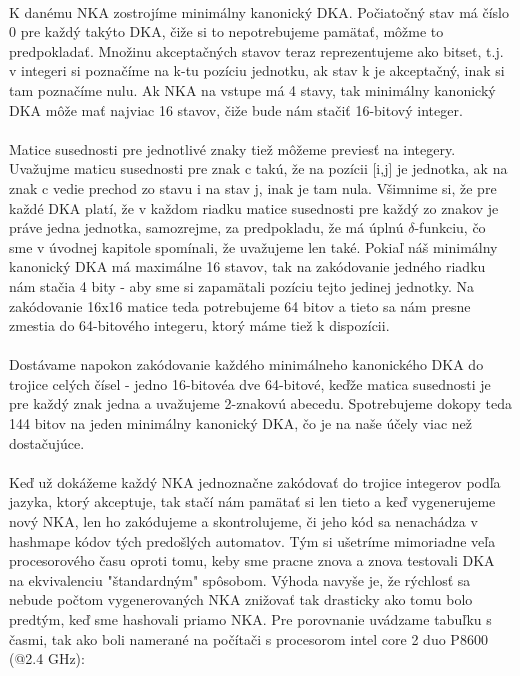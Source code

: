 \paragraph{}
K danému NKA zostrojíme minimálny kanonický DKA. Počiatočný stav má číslo 0 pre každý takýto DKA, čiže si to nepotrebujeme pamätať, môžme to predpokladať. Množinu akceptačných stavov teraz reprezentujeme ako bitset, t.j. v integeri si poznačíme na k-tu pozíciu jednotku, ak stav k je akceptačný, inak si tam poznačíme nulu. Ak NKA na vstupe má 4 stavy, tak minimálny kanonický DKA môže mať najviac 16 stavov, čiže bude nám stačiť 16-bitový integer. 
\paragraph{}
Matice susednosti pre jednotlivé znaky tiež môžeme previesť na integery. Uvažujme maticu susednosti pre znak c takú, že na pozícii [i,j] je jednotka, ak na znak c vedie prechod zo stavu i na stav j, inak je tam nula. Všimnime si, že pre každé DKA platí, že v každom riadku matice susednosti pre každý zo znakov je práve jedna jednotka, samozrejme, za predpokladu, že má úplnú $\delta$-funkciu, čo sme v úvodnej kapitole spomínali, že uvažujeme len také. Pokiaľ náš minimálny kanonický DKA má maximálne 16 stavov, tak na zakódovanie jedného riadku nám stačia 4 bity - aby sme si zapamätali pozíciu tejto jedinej jednotky. Na zakódovanie 16x16 matice teda potrebujeme 64 bitov a tieto sa nám presne zmestia do 64-bitového integeru, ktorý máme tiež k dispozícii.
\paragraph{}
Dostávame napokon zakódovanie každého minimálneho kanonického DKA do trojice celých čísel - jedno 16-bitovéa dve 64-bitové, keďže matica susednosti je pre každý znak jedna a uvažujeme 2-znakovú abecedu. Spotrebujeme dokopy teda 144 bitov na jeden minimálny kanonický DKA, čo je na naše účely viac než dostačujúce.
\paragraph{}
Keď už dokážeme každý NKA jednoznačne zakódovať do trojice integerov podľa jazyka, ktorý akceptuje, tak stačí nám pamätať si len tieto a keď vygenerujeme nový NKA, len ho zakódujeme a skontrolujeme, či jeho kód sa nenachádza v hashmape kódov tých predošlých automatov. Tým si ušetríme mimoriadne veľa procesorového času oproti tomu, keby sme pracne znova a znova testovali DKA na ekvivalenciu "štandardným" spôsobom. Výhoda navyše je, že rýchlosť sa nebude počtom vygenerovaných NKA znižovať tak drasticky ako tomu bolo predtým, keď sme hashovali priamo NKA. Pre porovnanie uvádzame tabuľku s časmi, tak ako boli namerané na počítači s procesorom intel core 2 duo P8600 (@2.4 GHz):








